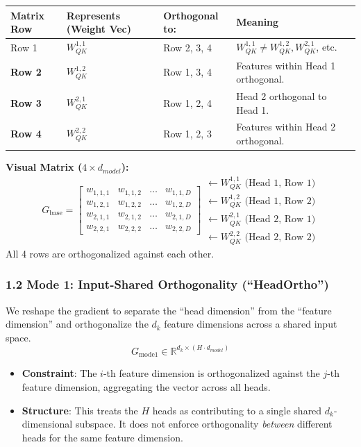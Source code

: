 \documentclass[12pt]{article}
\begin{document}
\begin{table}[h]
\centering
\color{lighttext}
\begin{tabularx}{\textwidth}{l l l X}
\toprule
Matrix Row & Represents (Weight Vec) & Orthogonal to: & Meaning \\
\midrule
Row 1 & $W_{QK}^{1,1}$ & Row 2, 3, 4 & $W_{QK}^{1,1} \neq W_{QK}^{1,2}, W_{QK}^{2,1}$, etc. \\
\textbf{Row 2} & $W_{QK}^{1,2}$ & Row 1, 3, 4 & Features within Head 1 orthogonal. \\
\textbf{Row 3} & $W_{QK}^{2,1}$ & Row 1, 2, 4 & Head 2 orthogonal to Head 1. \\
\textbf{Row 4} & $W_{QK}^{2,2}$ & Row 1, 2, 3 & Features within Head 2 orthogonal. \\
\bottomrule
\end{tabularx}
\end{table}

\textbf{Visual Matrix ($4 \times d_{model}$):}
$$
G_{\text{base}} = 
\begin{bmatrix}
w_{1,1,1} & w_{1,1,2} & \dots & w_{1,1,D} \\
w_{1,2,1} & w_{1,2,2} & \dots & w_{1,2,D} \\
w_{2,1,1} & w_{2,1,2} & \dots & w_{2,1,D} \\
w_{2,2,1} & w_{2,2,2} & \dots & w_{2,2,D}
\end{bmatrix}
\begin{matrix}
\leftarrow W_{QK}^{1,1} \text{ (Head 1, Row 1)} \\
\leftarrow W_{QK}^{1,2} \text{ (Head 1, Row 2)} \\
\leftarrow W_{QK}^{2,1} \text{ (Head 2, Row 1)} \\
\leftarrow W_{QK}^{2,2} \text{ (Head 2, Row 2)}
\end{matrix}
$$
All 4 rows are orthogonalized against each other.

\subsubsection*{1.2 Mode 1: Input-Shared Orthogonality (``HeadOrtho'')}
We reshape the gradient to separate the ``head dimension'' from the ``feature dimension'' and orthogonalize the $d_k$ feature dimensions across a shared input space.
$$G_{\text{mode1}} \in \mathbb{R}^{d_k \times (H \cdot d_{model})}$$
\begin{itemize}
    \item \textbf{Constraint}: The $i$-th feature dimension is orthogonalized against the $j$-th feature dimension, aggregating the vector across all heads.
    \item \textbf{Structure}: This treats the $H$ heads as contributing to a single shared $d_k$-dimensional subspace. It does not enforce orthogonality \textit{between} different heads for the same feature dimension.
\end{itemize}
\end{document}
